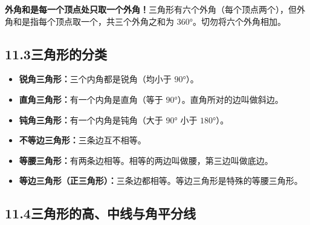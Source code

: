 \documentclass[12pt, a4paper]{ctexart}
\begin{document}
\begin{warnbox}[易错提醒]
\textbf{外角和是每一个顶点处只取一个外角！}三角形有六个外角（每个顶点两个），但外角和是指每个顶点取一个，共三个外角之和为 $360°$。切勿将六个外角相加。
\end{warnbox}

\subsection*{11.3\quad 三角形的分类}

\begin{knowledgebox}[按角分类]
\begin{itemize}[nosep]
  \item \textbf{锐角三角形：}三个内角都是锐角（均小于 $90°$）。
  \item \textbf{直角三角形：}有一个内角是直角（等于 $90°$）。直角所对的边叫做斜边。
  \item \textbf{钝角三角形：}有一个内角是钝角（大于 $90°$ 小于 $180°$）。
\end{itemize}
\begin{center}
\end{center}
\end{knowledgebox}

\begin{knowledgebox}[按边分类]
\begin{itemize}[nosep]
  \item \textbf{不等边三角形：}三条边互不相等。
  \item \textbf{等腰三角形：}有两条边相等。相等的两边叫做腰，第三边叫做底边。
  \item \textbf{等边三角形（正三角形）：}三条边都相等。等边三角形是特殊的等腰三角形。
\end{itemize}
\end{knowledgebox}

\subsection*{11.4\quad 三角形的高、中线与角平分线}
\end{document}
